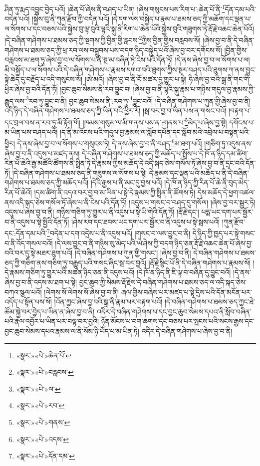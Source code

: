 ཤིན་ཏུ་རྨད་འབྱུང་བྱེད་པའོ། །ཆེན་པོ་ཞེས་ནི་བཤད་པ་ཡིན། །ཞེས་གསུངས་པས་རིག་པ་:ཆེན་པོ་ནི་\footnote{«སྣར་»«པེ་»ཆེན་པོ་}དོན་དམ་པའི་བདེན་པའོ། །སྐྱེས་བུ་ནི་ཀུན་རྫོབ་ཀྱི་བདེན་པའོ། །དེ་དག་ལས་བསྐྱེད་པ་རྣམ་པ་ཐམས་ཅད་ཀྱི་མཆོག་དང་ལྡན་པ་ལ་སོགས་པ་དང་བཅས་པའི་སྐྱེས་བུ་ལྟ་བུའི་ལྷའི་སྐུ་ནི་རིག་པ་ཆེན་པོའི་སྐྱེས་བུའི་གཟུགས་ཏེ་རྡོ་རྗེ་འཆང་ཆེན་པོའོ། །དེ་བཞིན་གཤེགས་པ་ཐམས་ཅད་ཀྱི་སྔགས་ཀྱི་བྱིན་གྱི་རླབས་\footnote{«སྣར་»«པེ་»བརླབས་}ཀྱིས་བྱིན་གྱིས་བརླབས་སོ། །ཞེས་བྱ་བ་ནི་དེ་བཞིན་གཤེགས་པ་ཐམས་ཅད་ཀྱི་ཕྲ་རབ་ལས་བསྒྲུབས་པས་བདག་ཉིད་བསྐྱེད་པའོ་ཞེས་བྱ་བར་དགོངས་སོ། །བྱིན་གྱིས་བརླབས་མ་ཐག་ཏུ་ཞེས་བྱ་བ་ལ་སོགས་པ་ནི་སྔ་མ་བཞིན་ཏེ་ངེས་པའི་དོན་ཏོ། །དེ་ནས་ཞེས་བྱ་བ་ལ་སོགས་པ་ལ། མི་བསྐྱོད་པ་ལ་སོགས་པའི་དེ་བཞིན་གཤེགས་པ་རྣམས་དགའ་བའི་ཐུགས་ཀྱིས་སྔར་བཤད་པའི་ཐུགས་ཀ་ནས་བྱུང་སྟེ་ཆེད་དུ་བརྗོད་པ་འདི་གསུངས་སོ། །ཨེ་མའོ། །ཞེས་བྱ་བ་ནི་ངོ་མཚར་དུ་གྱུར་པ་སྟེ། ཧི་ཞེས་བྱ་བའི་སྒྲ་ནི་གང་གི་ཕྱིར་ཞེས་བྱ་བའི་དོན་ཏོ། །བྱང་ཆུབ་སེམས་ནི་རབ་བྱུང་བ། །ཞེས་བྱ་བ་ནི་ལྷའི་སྐུ་རྣམ་པ་གཉིས་གདུལ་བྱ་རྣམས་ཀྱི་རྒྱུད་ལས་\footnote{«སྣར་»«པེ་»ལ་}རབ་ཏུ་བྱུང་བ་ནི། བྱང་ཆུབ་སེམས་ནི་:རབ་ཏུ་\footnote{«སྣར་»«པེ་»རབ་}བྱུང་བའོ། །དེ་བཞིན་གཤེགས་པ་ཀུན་གྱི་ཞེས་བྱ་བ་ནི། འདི་ཉིད་དེ་བཞིན་གཤེགས་པ་ཐམས་ཅད་ཀྱི་ཡིན་པའི་ཕྱིར་རོ། །སྦ་བར་བྱ་བ་ཡིན་པས་ན་གསང་བའོ། །བརྟག་པ་དང་བྲལ་བས་ན་རབ་ཏུ་མི་རྟོག་གོ། །ཁམས་གསུམ་ལ་མི་གནས་པས་ན་:གནས་པ་\footnote{«སྣར་»«པེ་»གནས་}མེད་པ་ཞེས་བྱ་སྟེ། དགོངས་པ་མ་ཡིན་པས་བཤད་པའོ། །ད་ནི་མ་འོངས་པའི་གདུལ་བྱ་རྣམས་ལ་སློབ་དཔོན་དང་སློབ་མའི་འབྲེལ་པ་བསྟན་པའི་ཕྱིར། དེ་ནས་ཞེས་བྱ་བ་ལ་སོགས་པ་གསུངས་ཏེ། དེ་ནས་ཞེས་བྱ་བ་ནི་བཤད་\footnote{«སྣར་»«པེ་»འདས་}མ་ཐག་པའོ། །གཅིག་ཏུ་འདུས་ནས་ཞེས་བྱ་བ་ནི་འདུས་པ་མཛད་ནས། དེ་བཞིན་གཤེགས་པ་ཐམས་ཅད་ཀྱི་མཆོད་པ་སྤྲོས་པ་དེ་ཁོ་ན་ཉིད་དམ་ཚིག་རིན་པོ་ཆེའི་རྒྱ་མཚོའི་ཚོགས་ནི་སྤྲིན་ཏེ་དེ་རྣམས་ཀྱིས་མཆོད་དེ་འདི་སྐད་ཅེས་གསོལ་ཏོ་ཞེས་བྱ་བ་ནི་དྲང་བའི་དོན་ཏོ། །དེ་བཞིན་གཤེགས་པ་ཐམས་ཅད་ནི་གཟུགས་ལ་སོགས་པ་སྟེ། དེ་རྣམས་དང་ལྡན་པའི་མཆོད་པ་ནི་དེ་བཞིན་གཤེགས་པ་ཐམས་ཅད་ཀྱི་མཆོད་པའོ། །དེའི་རྒྱས་པ་ནི་མང་དུ་བྱས་པའོ། །དེ་ཁོ་ན་ཉིད་ཀྱི་རིན་པོ་ཆེ་ནི་བུད་མེད་རིན་པོ་ཆེའོ། །དམ་ཚིག་ནི་འདའ་བར་བྱ་བ་མ་ཡིན་པ་སྟེ་དེ་རྣམས་ཀྱི་སྤྲིན་ནི་ཚོགས་ཏེ། དེས་མཆོད་དེ་ཕྱག་འཚལ་ནས་འདི་སྐད་ཅེས་གསོལ་ཏོ་ཞེས་པ་ནི་ངེས་པའི་དོན་ཏོ། །འདུས་པ་གསང་བ་བཤད་དུ་གསོལ། །ཞེས་བྱ་བར་སྦྱར་ཏེ། འདུས་པ་ཞེས་བྱ་བ་ནི། གཉིས་གཅིག་ཏུ་གྱུར་པ་ནི་འདུས་པ་སྟེ་ཡི་གེའི་དོན་ཏོ། །རྡོ་རྗེ་དང་། པདྨ་ཡང་དག་པར་སྦྱོར་བ་ནི་འདུས་པ་སྟེ་སྤྱིའི་དོན་ཏོ། །ཤེས་རབ་དང་ཐབས་ཡང་དག་པར་སྦྱོར་བ་ནི་འདུས་པ་སྟེ་སྦས་པའོ། །ཀུན་རྫོབ་དང་:དོན་དམ་པའི་\footnote{«སྣར་»«པེ་»དོན་དམ་}བདེན་པ་དག་འདྲེས་པ་ནི་འདུས་པའོ། །གསང་བ་ལས་བྱུང་བ་ནི། དེ་ཉིད་ཀྱི་ཁྱད་པར་སྟེ་གསང་བ་ནི་འོད་གསལ་བའོ། །དེ་ལས་བྱུང་བ་ནི་གཉིས་སུ་མེད་པའི་ཡེ་ཤེས་ཀྱི་བདག་ཉིད་ཅན་རྡོ་རྗེ་འཆང་ཆེན་པོ་ཞེས་བྱ་བའི་བར་དུ་སྟེ་མཐར་ཐུག་པའོ། །དེ་བཞིན་གཤེགས་པ་ཀུན་གྱི་གསང་། །ཞེས་བྱ་བ་ནི། དེ་བཞིན་གཤེགས་པ་ཐམས་ཅད་ཀྱི་གཅིག་ནས་གཅིག་ཏུ་བརྒྱུད་པའི་གསང་ཞིང་སྦ་བར་བྱའོ། །རྡོ་རྗེ་སྙིང་པོ་ནི་དེ་བཞིན་གཤེགས་པ་རྣམས་སོ། །དེ་རྣམས་གཅིག་ཏུ་གྱུར་པའི་མཚན་ཉིད་ཅན་ནི་འདུས་པའོ། །དེ་ཁོ་ན་ཉིད་ནི་ཇི་ལྟ་བ་བཞིན་དུ་བྱུང་བའོ། །དེ་ནས་ཞེས་བྱ་བ་ནི་འདས་མ་ཐག་པ་སྟེ། བྱང་ཆུབ་ཀྱི་སེམས་རྡོ་རྗེས་དེ་བཞིན་གཤེགས་པ་ཐམས་ཅད་ལ་འདི་སྐད་ཅེས་བཀའ་སྩལ་པའོ། །ལེགས་སོ་ལེགས་སོ་ཞེས་བྱ་བ་ནི། ཞལ་གྱིས་བཞེས་པར་མཛད་པ་སྟེ་དྲིས་པའི་དོན་མངོན་པར་འདོད་པ་སྟོན་པས་སོ། །འོན་ཀྱང་ཞེས་བྱ་བའི་སྒྲ་ནི་རྣམ་པར་བརྟག་པའོ། །དེ་བཞིན་གཤེགས་པ་ཐམས་ཅད་ཀྱང་ཐེ་ཚོམ་སྐྱེ་བར་བྱེད་པ་ཡིན་ན་ཞེས་བྱ་བ་ནི། འདིར་དེ་བཞིན་གཤེགས་པ་དང་བྱང་ཆུབ་སེམས་དཔའ་ནི་སློབ་བཞིན་པའི་རྣལ་འབྱོར་པ་ཡིན་པར་བལྟ་བར་བྱའི། ཉོན་མོངས་པ་བག་ཆགས་དང་བཅས་པར་སྤངས་པའི་སངས་རྒྱས་དང་བྱང་ཆུབ་སེམས་དཔའ་རྣམས་ལ་ནི་སོམ་ཉི་ཡོད་པ་མ་ཡིན་ཏེ། འདིར་དེ་བཞིན་གཤེགས་པ་ཞེས་བྱ་བ་ནི། 